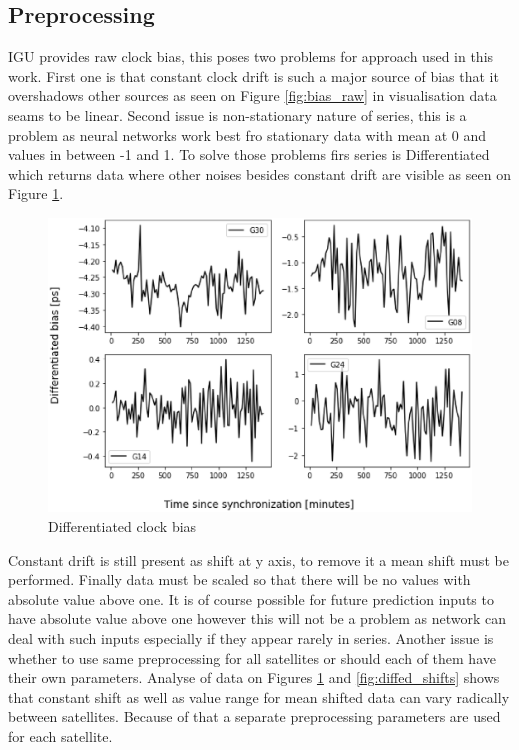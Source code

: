 \documentclass{kybernetika}
\begin{document}
\subsection{Preprocessing}
IGU provides raw clock bias, this poses two problems for approach used in this work.
First one is that constant clock drift is such a major source of bias that it overshadows other
sources as seen on Figure \ref{fig:bias_raw} in visualisation data seams to be linear.
Second issue is non-stationary nature of series, this is a problem as neural networks work best
fro stationary data with mean at 0 and values in between -1 and 1. To solve those problems firs
series is Differentiated which returns data where other noises besides constant drift are visible as
seen on Figure \ref{fig:diffed_bias}.
\begin{figure}[H] 
\centering
\includegraphics[width=\textwidth]{figures/bias_diffed}
\caption{Differentiated clock bias}
\label{fig:diffed_bias}
\end{figure}
Constant drift is still present as shift at y axis, to remove it a mean shift must be performed.
Finally data must be scaled so that there will be no values with absolute value above one. It is
of course possible for future prediction inputs to have absolute value above one however this will
not be a problem as network can deal with such inputs especially if they appear rarely in series.
Another issue is whether to use same preprocessing for all satellites or should each of them 
have their own parameters.
Analyse of data on Figures \ref{fig:diffed_bias} and \ref{fig:diffed_shifts} shows that
constant shift as well as value range for mean shifted data can vary radically between satellites.
Because of that a separate preprocessing parameters are used for each satellite.
\end{document}
